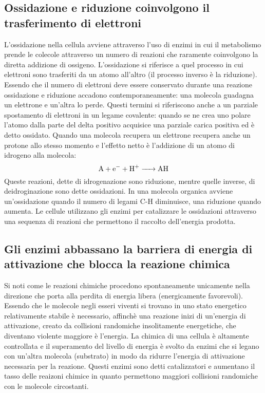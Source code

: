 \subsection{Ossidazione e riduzione coinvolgono il trasferimento di elettroni}
L'ossidazione nella cellula avviene attraverso l'uso di enzimi in cui il metabolismo prende le colecole attraverso un numero di reazioni che raramente coinvolgono la diretta addizione 
di ossigeno. L'ossidazione si riferisce a quel processo in cui elettroni sono trasferiti da un atomo all'altro (il processo inverso \`e la riduzione). Essendo che il numero di elettroni
deve essere conservato durante una reazione ossidazione e riduzione accadono contemporaneamente: una molecola guadagna un elettrone e un'altra lo perde. Questi termini si riferiscono
anche a un parziale spostamento di elettroni in un legame covalente: quando se ne crea uno polare l'atomo dalla parte del delta positivo acquisice una parziale carica positiva ed \`e
detto ossidato. Quando una molecola recupera un elettrone recupera anche un protone allo stesso momento e l'effetto netto \`e l'addizione di un atomo di idrogeno alla molecola:
$$\ce{A + e- + H+ -> AH}$$
Queste reazioni, dette di idrogenazione sono riduzione, mentre quelle inverse, di deidroginazione sono dette ossidazioni. In una molecola organica avviene un'ossidazione quando il numero
di legami C-H diminuisce, una riduzione quando aumenta. Le cellule utilizzano gli enzimi per catalizzare le ossidazioni attraverso una sequenza di reazioni che permettono il raccolto
dell'energia prodotta. 
\subsection{Gli enzimi abbassano la barriera di energia di attivazione che blocca la reazione chimica}
Si noti come le reazioni chimiche procedono spontaneamente unicamente nella direzione che porta alla perdita di energia libera (energicamente favorevoli). Essendo che le molecole negli
esseri viventi si trovano in uno stato energetico relativamente stabile \`e necessario, affinch\`e una reazione inizi di un'energia di attivazione, creato da collisioni randomiche 
insolitamente energetiche, che diventano violente maggiore \`e l'energia. La chimica di una cellula \`e altamente controllata e il superamento del livello di energia \`e svolto da 
enzimi che si legano con un'altra molecola (substrato) in modo da ridurre l'energia di attivazione necessaria per la reazione. Questi enzimi sono detti catalizzatori e aumentano il 
tasso delle reaizoni chimice in quanto permettono maggiori collisioni randomiche con le molecole circostanti. 
